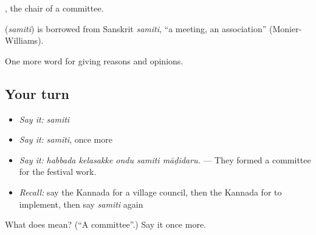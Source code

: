  , the chair of a committee.

\begin{cousinweb}
\textbf{} (\emph{samiti}) is borrowed from Sanskrit \emph{samiti}, \textquotedblleft{}a meeting, an association\textquotedblright{} (Monier-Williams).
\end{cousinweb}

\begin{grammarlens}[title={What you've built}]
One more word for giving reasons and opinions.
\end{grammarlens}

\subsection*{Your turn}
\begin{itemize}
\raggedright
  \item \emph{Say it:} \emph{samiti}
  \item \emph{Say it:} \emph{samiti}, once more
  \item \emph{Say it:} \emph{habbada kelasakke ondu samiti māḍidaru.} — They formed a committee for the festival work.
  \item \emph{Recall:} say the Kannada for a village council, then the Kannada for to implement, then say \emph{samiti} again
\end{itemize}

\begin{tcolorbox}[breakable,colback=teal!4,colframe=teal!35!black,title={Before you move on}]
What does  mean? (\textquotedblleft{}A committee\textquotedblright{}.) Say it once more.
\end{tcolorbox}
